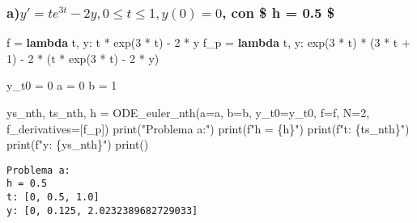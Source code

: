 \documentclass[
  letterpaper,
  DIV=11,
  numbers=noendperiod]{scrartcl}
\newenvironment{Shaded}{\begin{snugshade}}{\end{snugshade}}
\newcommand{\BuiltInTok}[1]{\textcolor[rgb]{0.00,0.23,0.31}{#1}}
\newcommand{\DecValTok}[1]{\textcolor[rgb]{0.68,0.00,0.00}{#1}}
\newcommand{\KeywordTok}[1]{\textcolor[rgb]{0.00,0.23,0.31}{\textbf{#1}}}
\newcommand{\NormalTok}[1]{\textcolor[rgb]{0.00,0.23,0.31}{#1}}
\newcommand{\OperatorTok}[1]{\textcolor[rgb]{0.37,0.37,0.37}{#1}}
\newcommand{\SpecialCharTok}[1]{\textcolor[rgb]{0.37,0.37,0.37}{#1}}
\newcommand{\SpecialStringTok}[1]{\textcolor[rgb]{0.13,0.47,0.30}{#1}}
\newcommand{\StringTok}[1]{\textcolor[rgb]{0.13,0.47,0.30}{#1}}
\begin{document}
\subsubsection{\texorpdfstring{a)\(y' = te^{3t}-2y, 0 \leq t \leq 1 ,  y(0) = 0\),
con \$ h = 0.5
\$}{a)y\textquotesingle{} = te\^{}\{3t\}-2y, 0 \textbackslash leq t \textbackslash leq 1 ,  y(0) = 0, con \$ h = 0.5 \$}}\label{ay-te3t-2y-0-leq-t-leq-1-y0-0-con-h-0.5}

\begin{Shaded}
\begin{Highlighting}[]
\NormalTok{f }\OperatorTok{=} \KeywordTok{lambda}\NormalTok{ t, y: t }\OperatorTok{*}\NormalTok{ exp(}\DecValTok{3} \OperatorTok{*}\NormalTok{ t) }\OperatorTok{{-}} \DecValTok{2} \OperatorTok{*}\NormalTok{ y}
\NormalTok{f\_p }\OperatorTok{=} \KeywordTok{lambda}\NormalTok{ t, y: exp(}\DecValTok{3} \OperatorTok{*}\NormalTok{ t) }\OperatorTok{*}\NormalTok{ (}\DecValTok{3} \OperatorTok{*}\NormalTok{ t }\OperatorTok{+} \DecValTok{1}\NormalTok{) }\OperatorTok{{-}} \DecValTok{2} \OperatorTok{*}\NormalTok{ (t }\OperatorTok{*}\NormalTok{ exp(}\DecValTok{3} \OperatorTok{*}\NormalTok{ t) }\OperatorTok{{-}} \DecValTok{2} \OperatorTok{*}\NormalTok{ y)}

\NormalTok{y\_t0 }\OperatorTok{=} \DecValTok{0}
\NormalTok{a }\OperatorTok{=} \DecValTok{0}
\NormalTok{b }\OperatorTok{=} \DecValTok{1}

\NormalTok{ys\_nth, ts\_nth, h }\OperatorTok{=}\NormalTok{ ODE\_euler\_nth(a}\OperatorTok{=}\NormalTok{a, b}\OperatorTok{=}\NormalTok{b, y\_t0}\OperatorTok{=}\NormalTok{y\_t0, f}\OperatorTok{=}\NormalTok{f, N}\OperatorTok{=}\DecValTok{2}\NormalTok{, f\_derivatives}\OperatorTok{=}\NormalTok{[f\_p])}
\BuiltInTok{print}\NormalTok{(}\StringTok{"Problema a:"}\NormalTok{)}
\BuiltInTok{print}\NormalTok{(}\SpecialStringTok{f"h = }\SpecialCharTok{\{}\NormalTok{h}\SpecialCharTok{\}}\SpecialStringTok{"}\NormalTok{)}
\BuiltInTok{print}\NormalTok{(}\SpecialStringTok{f"t: }\SpecialCharTok{\{}\NormalTok{ts\_nth}\SpecialCharTok{\}}\SpecialStringTok{"}\NormalTok{)}
\BuiltInTok{print}\NormalTok{(}\SpecialStringTok{f"y: }\SpecialCharTok{\{}\NormalTok{ys\_nth}\SpecialCharTok{\}}\SpecialStringTok{"}\NormalTok{)}
\BuiltInTok{print}\NormalTok{()}
\end{Highlighting}
\end{Shaded}

\begin{verbatim}
Problema a:
h = 0.5
t: [0, 0.5, 1.0]
y: [0, 0.125, 2.0232389682729033]
\end{verbatim}
\end{document}
